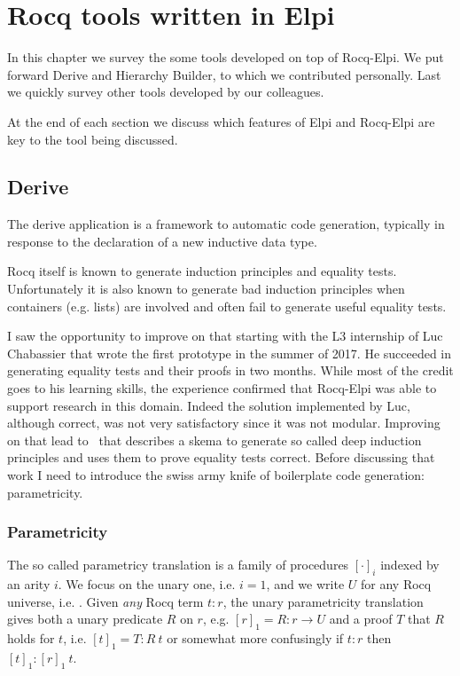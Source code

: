 \documentclass[a4paper, 11pt]{book}
\begin{document}
\chapter{Rocq tools written in Elpi}

In this chapter we survey the some tools developed on top of Rocq-Elpi.
We put forward Derive and Hierarchy Builder, to which we contributed personally.
Last we quickly survey other tools developed by our colleagues.

At the end of each section we discuss which features of Elpi and Rocq-Elpi
are key to the tool being discussed.

\section{Derive}\label{sec:derive}

The derive application is a framework to automatic
code generation, typically in response to the declaration of a new inductive
data type.

Rocq itself is known to generate induction principles and equality tests.
Unfortunately it is also known to generate bad induction principles when
containers (e.g. lists) are involved and often fail to generate useful
equality tests.

I saw the opportunity to improve on that starting with the L3 internship of
Luc Chabassier that wrote the first prototype in the summer of 2017.
He succeeded in generating
equality tests and their proofs in two months. While most of the credit goes to
his learning skills, the experience confirmed that Rocq-Elpi was able to support
research in this domain. Indeed the solution implemented by Luc, although
correct, was not very satisfactory since it was not modular. Improving
on that lead to~\cite{tassi:hal-01897468} that describes a skema to
generate so called deep induction principles and uses them to prove
equality tests correct. Before discussing that work I need to introduce
the swiss army knife of boilerplate code generation: parametricity.

\subsection{Parametricity}\label{sec:param1}

The so called parametricy translation \cite{keller_et_al:LIPIcs.CSL.2012.381}
is a family of procedures $[\cdot]_i$ indexed by an arity $i$. We focus on the
unary one, i.e. $i=1$, and we write $U$ for any Rocq universe, i.e. .
Given \emph{any} Rocq term $t : r$, the unary parametricity
translation gives both a unary predicate $R$ on $r$, e.g. $[r]_1 = R : r \to U$
and a proof $T$ that $R$ holds for $t$, i.e. $[t]_1 = T : R~ t$ or somewhat more
confusingly if $t : r$ then $[t]_1 : [r]_1~ t$.
\end{document}
